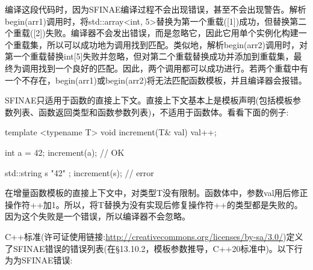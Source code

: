 编译这段代码时，因为SFINAE编译过程不会出现错误，甚至不会出现警告。解析begin(arr1)调用时，将std::array<int, 5>替换为第一个重载([1])成功，但替换第二个重载([2])失败。编译器不会发出错误，而是忽略它，因此它用单个实例化构建一个重载集，所以可以成功地为调用找到匹配。类似地，解析begin(arr2)调用时，对第一个重载替换int[5]失败并忽略，但对第二个重载替换成功并添加到重载集，最终为调用找到一个良好的匹配。因此，两个调用都可以成功进行。若两个重载中有一个不存在，begin(arr1)或begin(arr2)将无法匹配函数模板，并且编译器会报错。

SFINAE只适用于函数的直接上下文。直接上下文基本上是模板声明(包括模板参数列表、函数返回类型和函数参数列表)，不适用于函数体。看看下面的例子:

\begin{cpp}
template <typename T>
void increment(T& val) { val++; }

int a = 42;
increment(a); // OK

std::string s{ "42" };
increment(s); // error
\end{cpp}

在增量函数模板的直接上下文中，对类型T没有限制。函数体中，参数val用后修正操作符++加1。所以，将T替换为没有实现后修复操作符++的类型都是失败的。因为这个失败是一个错误，所以编译器不会忽略。

C++标准(许可证使用链接:\url{http://creativecommons.org/licenses/by-sa/3.0/})定义了SFINAE错误的错误列表(在§13.10.2，模板参数推导，C++20标准中)。以下行为为SFINAE错误:


